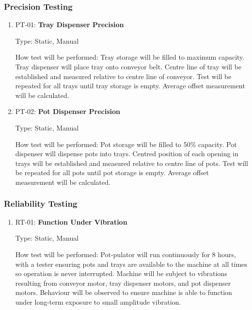 \documentclass[12pt, titlepage]{article}
\begin{document}
\subsubsection{Precision Testing}

\begin{enumerate}

  \item{PT-01: \textbf{Tray Dispenser Precision}}
  
  Type: Static, Manual

  How test will be performed: Tray storage will be filled to maximum capacity. Tray dispenser will place tray onto conveyor belt. 
  Centre line of tray will be established and measured relative to centre line of conveyor. Test will be repeated for all trays 
  until tray storage is empty. Average offset measurement will be calculated.
\\
  \item{PT-02: \textbf{Pot Dispenser Precision}}

  Type: Static, Manual

  How test will be performed: Pot storage will be filled to 50\% capacity. Pot dispenser will dispense pots into trays. Centred 
  position of each opening in trays will be established and measured relative to centre line of pots. Test will be repeated for all
  pots until pot storage is empty. Average offset measurement will be calculated.
  
\end{enumerate}

\subsubsection{Reliability Testing}

\begin{enumerate}

  \item{RT-01: \textbf{Function Under Vibration}}
  
  Type: Static, Manual

  How test will be performed: Pot-pulator will run continuously for 8 hours, with a tester ensuring pots and trays are available to the 
  machine at all times so operation is never interrupted. Machine will be subject to vibrations resulting from conveyor motor, tray dispenser
  motors, and pot dispenser motors. Behaviour will be observed to ensure machine is able to function under long-term exposure to small amplitude 
  vibration.
\end{enumerate}
\end{document}
